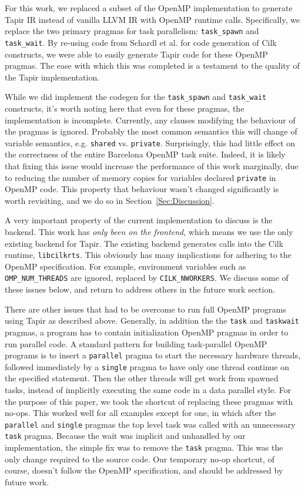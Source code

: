 \documentclass[sigconf]{acmart}
\begin{document}
For this work, we replaced a subset of the OpenMP implementation to generate
Tapir IR instead of vanilla LLVM IR with OpenMP runtime calls. Specifically, we
replace the two primary pragmas for task parallelism: \texttt{task\_spawn} and
\texttt{task\_wait}. By re-using code from Schardl et al. for code generation
of Cilk constructs, we were able to easily generate Tapir code for these OpenMP
pragmas. The ease with which this was completed is a testament to the quality of
the Tapir implementation. 

While we did implement the codegen for the \texttt{task\_spawn} and
\texttt{task\_wait} constructs, it's worth noting here that even for these
pragmas, the implementation is incomplete. Currently, any clauses modifying the 
behaviour of the pragmas is ignored. Probably the most common semantics this
will change of variable semantics, e.g. \texttt{shared} vs. \texttt{private}.
Surprisingly, this had little effect on the correctness of the entire Barcelona
OpenMP task suite. Indeed, it is likely that fixing this issue would increase
the performance of this work marginally, due to reducing the number of memory
copies for variables declared \texttt{private} in OpenMP code. This property
that behaviour wasn't changed significantly is worth revisiting, and we do so
in Section~\ref{Sec:Discussion}. 

A very important property of the current implementation to discuss is the
backend. This work has \emph{only been on the frontend}, which means we use
the only existing backend for Tapir. The existing backend generates calls into
the Cilk runtime, \texttt{libcilkrts}. This obviously has many implications for
adhering to the OpenMP specification. For example, environment variables such
as \texttt{OMP\_NUM\_THREADS} are ignored, replaced by \texttt{CILK\_NWORKERS}.
We discuss some of these issues below, and return to address others in the
future work section. 

There are other issues that had to be overcome to run full OpenMP programs
using Tapir as described above. Generally, in addition the the \texttt{task} 
and \texttt{taskwait} pragmas, a program has to contain initialization OpenMP
pragmas in order to run parallel code. A standard pattern for building
task-parallel OpenMP programs is to insert a \texttt{parallel} pragma to start
the necessary hardware threads, followed immediately by a \texttt{single}
pragma to have only one thread continue on the specified statement. Then the
other threads will get work from spawned tasks, instead of implicitly executing
the same code in a data parallel style. For the purpose of this paper, we took
the shortcut of replacing these pragmas with no-ops. This worked well for all
examples except for one, in which after the \texttt{parallel} and
\texttt{single} pragmas the top level task was called with an unnecessary
\texttt{task} pragma.  Because the wait was implicit and unhandled by our
implementation, the simple fix was to remove the \texttt{task} pragma. This was
the only change required to the source code. Our temporary no-op shortcut, of
course, doesn't follow the OpenMP specification, and should be addressed by
future work. 
\end{document}
